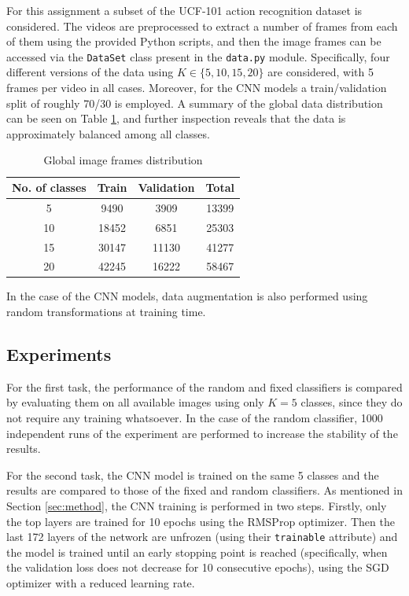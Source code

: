 \documentclass[letterpaper, 10 pt, conference]{IEEEtran}
\begin{document}
For this assignment a subset of the UCF-101 action recognition dataset \cite{ucf} is considered. The videos are preprocessed to extract a number of frames from each of them using the provided Python scripts, and then the image frames can be accessed via the \texttt{DataSet} class present in the \texttt{data.py} module. Specifically, four different versions of the data using $K\in\{5,10,15,20\}$ are considered, with 5 frames per video in all cases. Moreover, for the CNN models a train/validation split of roughly 70/30 is employed. A summary of the global data distribution can be seen on Table \ref{tab:data}, and further inspection reveals that the data is approximately balanced among all classes.

\begin{table}[h!]
  \centering
  \begin{tabular}{c|ccc}
    No. of classes & Train & Validation & Total\\
    \hline
    5 & 9490 & 3909 & 13399\\
    10 & 18452 & 6851 & 25303\\
    15 & 30147 & 11130 & 41277\\
    20 & 42245 & 16222 & 58467
  \end{tabular}\vspace{1em}
  \caption{Global image frames distribution}
  \label{tab:data}
\end{table}

In the case of the CNN models, data augmentation is also performed using random transformations at training time.

\subsection{Experiments}
\label{subsec:experiments}

For the first task, the performance of the random and fixed classifiers is compared by evaluating them on all available images using only $K=5$ classes, since they do not require any training whatsoever. In the case of the random classifier, 1000 independent runs of the experiment are performed to increase the stability of the results.

For the second task, the CNN model is trained on the same 5 classes and the results are compared to those of the fixed and random classifiers. As mentioned in Section \ref{sec:method}, the CNN training is performed in two steps. Firstly, only the top layers are trained for 10 epochs using the RMSProp optimizer. Then the last 172 layers of the network are unfrozen (using their \texttt{trainable} attribute) and the model is trained until an early stopping point is reached (specifically, when the validation loss does not decrease for 10 consecutive epochs), using the SGD optimizer with a reduced learning rate.
\end{document}

